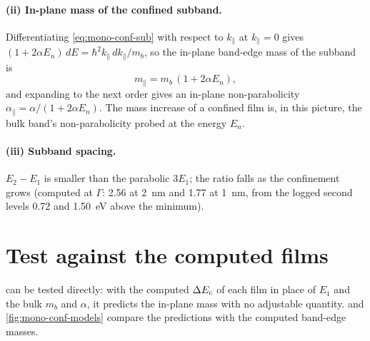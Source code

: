 \paragraph{(ii) In-plane mass of the confined subband.} Differentiating \cref{eq:mono-conf-sub} with respect to
$k_\parallel$ at $k_\parallel = 0$ gives $(1+2\alpha E_n)\,dE = \hbar^2k_\parallel\,dk_\parallel/m_b$, so the in-plane
band-edge mass of the subband is
\begin{equation}
m_\parallel = m_b\,(1 + 2\alpha E_n) ,
\label{eq:mono-conf-mpar}
\end{equation}
and expanding to the next order gives an in-plane non-parabolicity $\alpha_\parallel = \alpha/(1+2\alpha E_n)$. The
mass increase of a confined film is, in this picture, the bulk band's non-parabolicity probed at the energy $E_n$.

\paragraph{(iii) Subband spacing.} $E_2-E_1$ is smaller than the parabolic $3E_1$; the ratio falls as the confinement
grows (computed at $\Gamma$: 2.56 at 2~nm and 1.77 at 1~nm, from the logged second levels 0.72 and 1.50~eV above the
minimum).

\section{Test against the computed films}
\label{sec:mono-conf-test}

 can be tested directly: with the computed $\Delta E_{\mathrm{c}}$ of each film in place of $E_1$ and the bulk
$m_b$ and $\alpha$, it predicts the in-plane mass with no adjustable quantity.  and
\cref{fig:mono-conf-models} compare the predictions with the computed band-edge masses.

